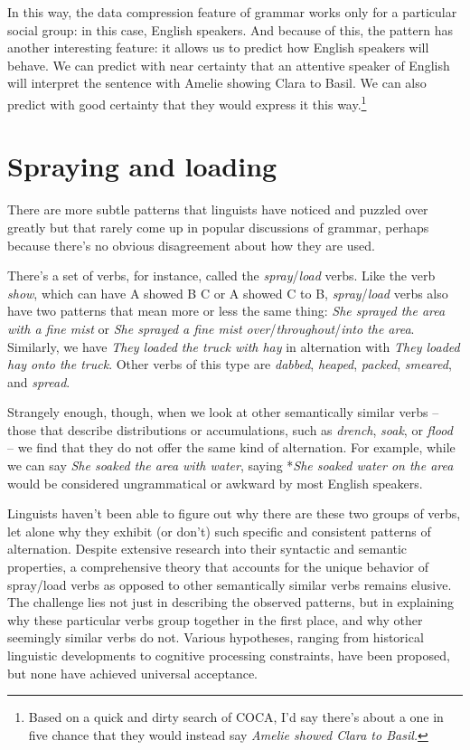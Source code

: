 In this way, the data compression feature of grammar works only for a particular social group: in this case, English speakers. And because of this, the pattern has another interesting feature: it allows us to predict how English speakers will behave. We can predict with near certainty that an attentive speaker of English will interpret the sentence with Amelie showing Clara to Basil. We can also predict with good certainty that they would express it this way.\footnote{Based on a quick and dirty search of COCA, I'd say there's about a one in five chance that they would instead say \textit{Amelie showed Clara to Basil.}}

\section{Spraying and loading}

There are more subtle patterns that linguists have noticed and puzzled over greatly but that rarely come up in popular discussions of grammar, perhaps because there's no obvious disagreement about how they are used.

There's a set of verbs, for instance, called the \textit{spray}/\textit{load} verbs. Like the verb \textit{show}, which can have A showed B C or A showed C to B, \textit{spray}/\textit{load} verbs also have two patterns that mean more or less the same thing: \textit{She sprayed the area with a fine mist} or \textit{She sprayed a fine mist over}/\textit{throughout}/\textit{into the area}. Similarly, we have \textit{They loaded the truck with hay} in alternation with \textit{They loaded hay onto the truck}. Other verbs of this type are \textit{dabbed}, \textit{heaped}, \textit{packed}, \textit{smeared}, and \textit{spread}.

Strangely enough, though, when we look at other semantically similar verbs -- those that describe distributions or accumulations, such as \textit{drench}, \textit{soak}, or \textit{flood} -- we find that they do not offer the same kind of alternation. For example, while we can say \textit{She soaked the area with water}, saying *\textit{She soaked water on the area} would be considered ungrammatical or awkward by most English speakers.

Linguists haven't been able to figure out why there are these two groups of verbs, let alone why they exhibit (or don't) such specific and consistent patterns of alternation. Despite extensive research into their syntactic and semantic properties, a comprehensive theory that accounts for the unique behavior of spray/load verbs as opposed to other semantically similar verbs remains elusive. The challenge lies not just in describing the observed patterns, but in explaining why these particular verbs group together in the first place, and why other seemingly similar verbs do not. Various hypotheses, ranging from historical linguistic developments to cognitive processing constraints, have been proposed, but none have achieved universal acceptance.

